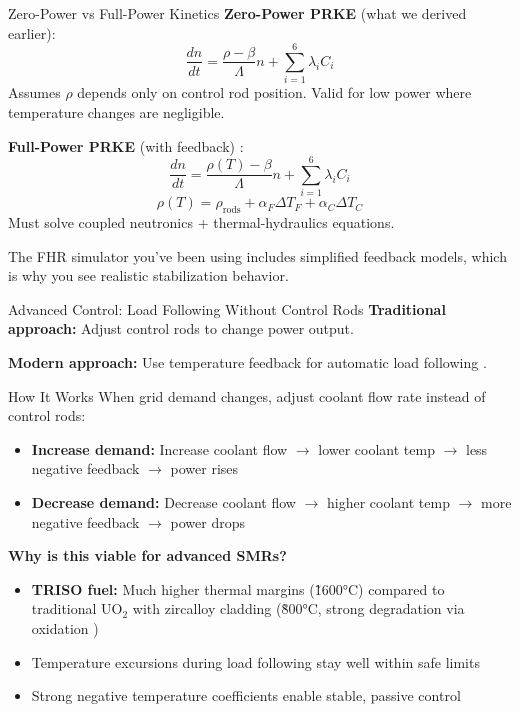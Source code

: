 \documentclass[aspectratio=169]{beamer}
\begin{document}
\begin{frame}[allowframebreaks]{Zero-Power vs Full-Power Kinetics}
    \textbf{Zero-Power PRKE} (what we derived earlier):
    $$ \frac{dn}{dt} = \frac{\rho - \beta}{\Lambda}n + \sum_{i=1}^{6} \lambda_i C_i $$
    Assumes $\rho$ depends only on control rod position. Valid for low power where temperature changes are negligible.

    \vspace{1em}
    \textbf{Full-Power PRKE} (with feedback) \cite{bell1970nuclear}:
    $$ \frac{dn}{dt} = \frac{\rho(T) - \beta}{\Lambda}n + \sum_{i=1}^{6} \lambda_i C_i $$
    $$ \rho(T) = \rho_{\text{rods}} + \alpha_F \Delta T_F + \alpha_C \Delta T_C $$
    Must solve coupled neutronics + thermal-hydraulics equations.

    \vspace{1em}
    The FHR simulator you've been using includes simplified feedback models, which is why you see realistic stabilization behavior.
\end{frame}

\begin{frame}[allowframebreaks]{Advanced Control: Load Following Without Control Rods}
    \textbf{Traditional approach:} Adjust control rods to change power output.

    \vspace{1em}
    \textbf{Modern approach:} Use temperature feedback for automatic load following \cite{zhang2024load}.

    \vspace{1em}
    \begin{block}{How It Works}
        When grid demand changes, adjust coolant flow rate instead of control rods:
        \begin{itemize}
            \item \textbf{Increase demand:} Increase coolant flow $\rightarrow$ lower coolant temp $\rightarrow$ less negative feedback $\rightarrow$ power rises
            \item \textbf{Decrease demand:} Decrease coolant flow $\rightarrow$ higher coolant temp $\rightarrow$ more negative feedback $\rightarrow$ power drops
        \end{itemize}
    \end{block}

    \vspace{1em}
    \textbf{Why is this viable for advanced SMRs?}
    \begin{itemize}
        \item \textbf{TRISO fuel:} Much higher thermal margins (\~ 1600°C) compared to traditional UO$_2$ 
			with zircalloy cladding (\~ 800°C, strong degradation via oxidation
			\cite{duriez2019zircaloy})
        \item Temperature excursions during load following stay well within safe limits
        \item Strong negative temperature coefficients enable stable, passive control
    \end{itemize}
\end{frame}
\end{document}
